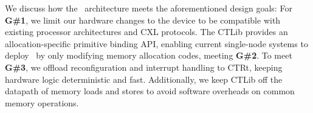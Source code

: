 \ifx\undefined\stale
We discuss how the \name~architecture meets the aforementioned design goals:
For \textbf{G\#1}, we limit our hardware changes to the device to be compatible with existing processor architectures and CXL protocols. 
The CTLib provides an allocation-specific primitive binding API, enabling current single-node systems to deploy \name~by only modifying memory allocation codes, meeting \textbf{G\#2}. 
To meet \textbf{G\#3}, we offload reconfiguration and interrupt handling to CTRt, keeping hardware logic deterministic and fast. Additionally, we keep CTLib off the datapath of memory loads and stores to avoid software overheads on common memory operations.
\fi





